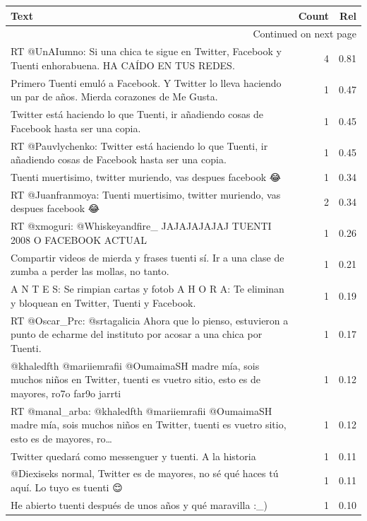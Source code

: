 \begin{longtable}{p{12.5cm}rr}
\toprule
Text & Count & Rel \\
\midrule
\endhead
\midrule
\multicolumn{3}{r}{{Continued on next page}} \\
\midrule
\endfoot

\bottomrule
\endlastfoot
RT @UnAIumno: Si una chica te sigue en Twitter, Facebook y Tuenti enhorabuena. HA CAÍDO EN TUS REDES. & 4 & 0.81 \\
Primero Tuenti emuló a Facebook. Y Twitter lo lleva haciendo un par de años. Mierda corazones de Me Gusta. & 1 & 0.47 \\
Twitter está haciendo lo que Tuenti, ir añadiendo cosas de Facebook hasta ser una copia. & 1 & 0.45 \\
RT @Pauvlychenko: Twitter está haciendo lo que Tuenti, ir añadiendo cosas de Facebook hasta ser una copia. & 1 & 0.45 \\
Tuenti muertisimo, twitter muriendo, vas despues facebook 😂 & 1 & 0.34 \\
RT @Juanfranmoya: Tuenti muertisimo, twitter muriendo, vas despues facebook 😂 & 2 & 0.34 \\
RT @xmoguri: @Whiskeyandfire\_ JAJAJAJAJAJ TUENTI 2008 O FACEBOOK ACTUAL & 1 & 0.26 \\
Compartir videos de mierda y frases tuenti sí. Ir a una clase de zumba a perder las mollas, no tanto. & 1 & 0.21 \\
A N T E S: Se rimpian cartas y fotob A H O R A: Te eliminan y bloquean en Twitter, Tuenti y Facebook. & 1 & 0.19 \\
RT @Oscar\_Prc: @srtagalicia Ahora que lo pienso, estuvieron a punto de echarme del instituto por acosar a una chica por Tuenti. & 1 & 0.17 \\
@khaledfth @mariiemrafii @OumaimaSH madre mía, sois muchos niños en Twitter, tuenti es vuetro sitio, esto es de mayores, ro7o far9o jarrti & 1 & 0.12 \\
RT @manal\_arba: @khaledfth @mariiemrafii @OumaimaSH madre mía, sois muchos niños en Twitter, tuenti es vuetro sitio, esto es de mayores, ro… & 1 & 0.12 \\
Twitter quedará como messenguer y tuenti. A la historia & 1 & 0.11 \\
@Diexiseks normal, Twitter es de mayores, no sé qué haces tú aquí. Lo tuyo es tuenti 😌 & 1 & 0.11 \\
He abierto tuenti después de unos años y qué maravilla :\_) & 1 & 0.10 \\

\end{longtable}
